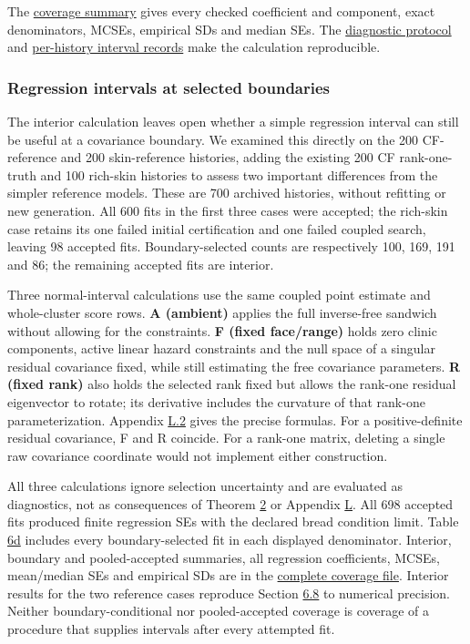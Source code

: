 \documentclass[11pt]{article}
\begin{document}
The \href{../results/manuscript_v09/coverage_summary.csv}{coverage summary} gives every checked coefficient and component, exact denominators, MCSEs, empirical SDs and median SEs. The \href{../docs/reproducibility.md}{diagnostic protocol} and \href{../results/manuscript_v09/coverage_records.jsonl.gz}{per-history interval records} make the calculation reproducible.

\subsubsection{Regression intervals at selected boundaries}\label{sec:6.8.1}

The interior calculation leaves open whether a simple regression interval can still be useful at a covariance boundary. We examined this directly on the 200 CF-reference and 200 skin-reference histories, adding the existing 200 CF rank-one-truth and 100 rich-skin histories to assess two important differences from the simpler reference models. These are 700 archived histories, without refitting or new generation. All 600 fits in the first three cases were accepted; the rich-skin case retains its one failed initial certification and one failed coupled search, leaving 98 accepted fits. Boundary-selected counts are respectively 100, 169, 191 and 86; the remaining accepted fits are interior.

Three normal-interval calculations use the same coupled point estimate and whole-cluster score rows. \textbf{A (ambient)} applies the full inverse-free sandwich without allowing for the constraints. \textbf{F (fixed face/range)} holds zero clinic components, active linear hazard constraints and the null space of a singular residual covariance fixed, while still estimating the free covariance parameters. \textbf{R (fixed rank)} also holds the selected rank fixed but allows the rank-one residual eigenvector to rotate; its derivative includes the curvature of that rank-one parameterization. Appendix \hyperref[sec:L.2]{L.2} gives the precise formulas. For a positive-definite residual covariance, F and R coincide. For a rank-one matrix, deleting a single raw covariance coordinate would not implement either construction.

All three calculations ignore selection uncertainty and are evaluated as diagnostics, not as consequences of Theorem \hyperref[res:Theorem-2]{2} or Appendix \hyperref[sec:L]{L}. All 698 accepted fits produced finite regression SEs with the declared bread condition limit. Table \hyperref[tab:6d]{6d} includes every boundary-selected fit in each displayed denominator. Interior, boundary and pooled-accepted summaries, all regression coefficients, MCSEs, mean/median SEs and empirical SDs are in the \href{../results/manuscript_v010/coverage_summary.csv}{complete coverage file}. Interior results for the two reference cases reproduce Section \hyperref[sec:6.8]{6.8} to numerical precision. Neither boundary-conditional nor pooled-accepted coverage is coverage of a procedure that supplies intervals after every attempted fit.
\end{document}
